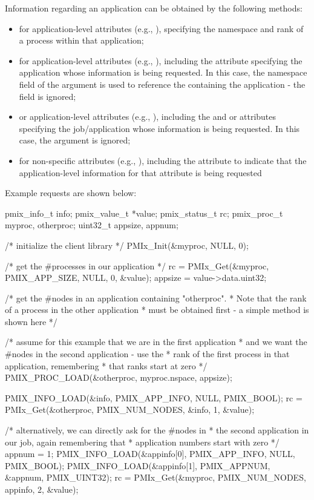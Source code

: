 Information regarding an application can be obtained by the following methods:

\begin{itemize}
\item for application-level attributes (e.g., ), specifying the namespace and rank of a process within that application;
\item for application-level attributes (e.g., ), including the  attribute specifying the application whose information is being requested. In this case, the namespace field of the  argument is used to reference the  containing the application - the  field is ignored;
\item or application-level attributes (e.g., ), including the  and  or  attributes specifying the job/application whose information is being requested. In this case, the  argument is ignored;
\item for non-specific attributes (e.g., ), including the  attribute to indicate that the application-level information for that attribute is being requested
\end{itemize}

Example requests are shown below:

\cspecificstart
\begin{codepar}
pmix_info_t info;
pmix_value_t *value;
pmix_status_t rc;
pmix_proc_t myproc, otherproc;
uint32_t appsize, appnum;

/* initialize the client library */
PMIx_Init(&myproc, NULL, 0);

/* get the #processes in our application */
rc = PMIx_Get(&myproc, PMIX_APP_SIZE, NULL, 0, &value);
appsize = value->data.uint32;

/* get the #nodes in an application containing "otherproc".
 * Note that the rank of a process in the other application
 * must be obtained first - a simple method is shown here */

/* assume for this example that we are in the first application
 * and we want the #nodes in the second application - use the
 * rank of the first process in that application, remembering
 * that ranks start at zero */
PMIX_PROC_LOAD(&otherproc, myproc.nspace, appsize);

PMIX_INFO_LOAD(&info, PMIX_APP_INFO, NULL, PMIX_BOOL);
rc = PMIx_Get(&otherproc, PMIX_NUM_NODES, &info, 1, &value);

/* alternatively, we can directly ask for the #nodes in
 * the second application in our job, again remembering that
 * application numbers start with zero */
appnum = 1;
PMIX_INFO_LOAD(&appinfo[0], PMIX_APP_INFO, NULL, PMIX_BOOL);
PMIX_INFO_LOAD(&appinfo[1], PMIX_APPNUM, &appnum, PMIX_UINT32);
rc = PMIx_Get(&myproc, PMIX_NUM_NODES, appinfo, 2, &value);

\end{codepar}
\cspecificend

